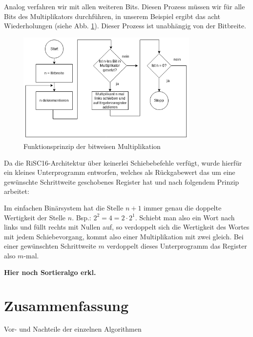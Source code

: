 \documentclass[fleqn, a4paper, 11pt]{article}       %
\begin{document}
Analog verfahren wir mit allen weiteren Bits. Diesen Prozess müssen wir für alle Bits des Multiplikators durchführen, in unserem Beispiel ergibt das acht Wiederholungen (siehe Abb. \ref{fig:bitw_Mul_Prinzip}). Dieser Prozess ist unabhängig von der Bitbreite.



\begin{figure}[h]
    \includegraphics[width =0.8\textwidth]{bitweise_Mul_Prinzip.png}
\caption{Funktionsprinzip der bitweisen Multiplikation}
\label{fig:bitw_Mul_Prinzip}
\end{figure}



Da die RiSC16-Architektur über keinerlei Schiebebefehle verfügt, wurde hierfür ein kleines Unterprogramm entworfen, welches als Rückgabewert das um eine gewünschte Schrittweite geschobenes Register hat und nach folgendem Prinzip arbeitet:

Im einfachen Binärsystem hat die Stelle $n+1$ immer genau die doppelte Wertigkeit der Stelle $n$. Bsp.: $2^2 = 4 = 2 \cdot 2^1$. Schiebt man also ein Wort nach links und füllt rechts mit Nullen auf, so verdoppelt sich die Wertigkeit des Wortes mit jedem Schiebevorgang, kommt also einer Multiplikation mit zwei gleich. Bei einer gewünschten Schrittweite $m$ verdoppelt dieses Unterprogramm das Register also $m$-mal.

\textbf{Hier noch Sortieralgo erkl.}

\section{Zusammenfassung}

\begin{compactitem}
    \item Vor- und Nachteile der einzelnen Algorithmen
\end{compactitem}
\end{document}
